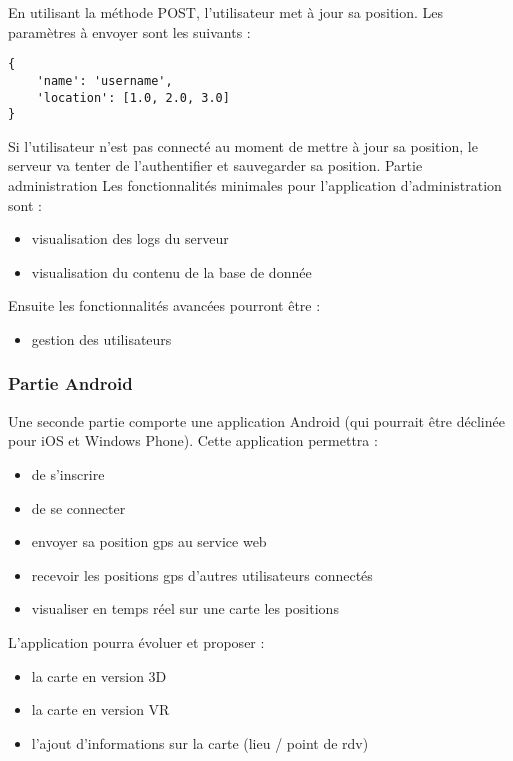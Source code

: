 En utilisant la méthode POST, l'utilisateur met à jour sa position. Les paramètres à envoyer sont les suivants :

\lstset{language=Javascript}
\begin{lstlisting}[caption=Corps de la requête where POST]
{
    'name': 'username',
    'location': [1.0, 2.0, 3.0]
}
\end{lstlisting}

Si l'utilisateur n'est pas connecté au moment de mettre à jour sa position, le serveur va tenter de l'authentifier et sauvegarder sa position.
Partie administration
Les fonctionnalités minimales pour l'application d'administration sont :
\begin{itemize}
    \item visualisation des logs du serveur
    \item visualisation du contenu de la base de donnée
\end{itemize}

Ensuite les fonctionnalités avancées pourront être :
\begin{itemize}
    \item gestion des utilisateurs
\end{itemize}


\subsubsection{Partie Android}
Une seconde partie comporte une application Android (qui pourrait être déclinée pour iOS et Windows Phone). Cette application permettra :
\begin{itemize}
    \item de s'inscrire
    \item de se connecter
    \item envoyer sa position gps au service web
    \item recevoir les positions gps d'autres utilisateurs connectés
    \item visualiser en temps réel sur une carte les positions
\end{itemize}

L'application pourra évoluer et proposer :
\begin{itemize}
    \item la carte en version 3D
    \item la carte en version VR
    \item l'ajout d'informations sur la carte (lieu / point de rdv)
\end{itemize}

